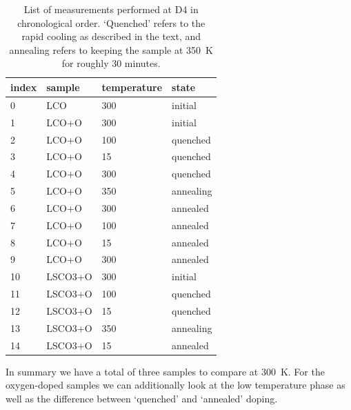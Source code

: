 \begin{table}
    \centering
    \begin{tabular}{llll}
        \toprule
        index &   sample & temperature &      state \\
        \midrule
        0  &      LCO &         300 &    initial \\
        1  &    LCO+O &         300 &    initial \\
        2  &    LCO+O &         100 &   quenched \\
        3  &    LCO+O &          15 &   quenched \\
        4  &    LCO+O &         300 &   quenched \\
        5  &    LCO+O &         350 &  annealing \\
        6  &    LCO+O &         300 &   annealed \\
        7  &    LCO+O &         100 &   annealed \\
        8  &    LCO+O &          15 &   annealed \\
        9  &    LCO+O &         300 &   annealed \\
        10 &  LSCO3+O &         300 &    initial \\
        11 &  LSCO3+O &         100 &   quenched \\
        12 &  LSCO3+O &          15 &   quenched \\
        13 &  LSCO3+O &         350 &  annealing \\
        14 &  LSCO3+O &          15 &   annealed \\
        \bottomrule
    \end{tabular}
    \caption{List of measurements performed at D4 in chronological order. `Quenched' refers to the rapid cooling as described in the text, and annealing refers to keeping the sample at \SI{350}{\kelvin} for roughly 30 minutes.}
    \label{tab:measurments}
\end{table}

In summary we have a total of three samples to compare at \SI{300}{\kelvin}. For the oxygen-doped samples we can additionally look at the low temperature phase as well as the difference between `quenched' and `annealed' doping.

